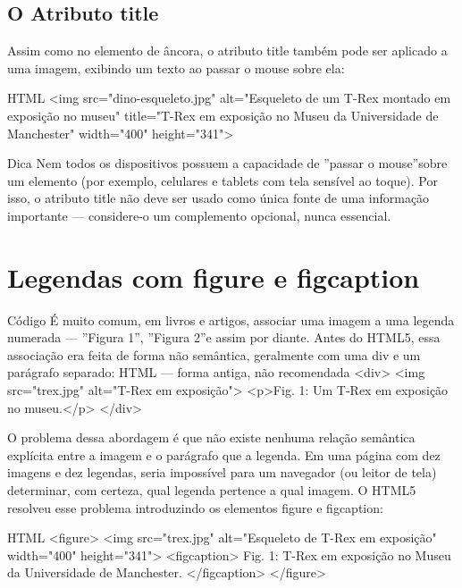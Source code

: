 \subsection{O Atributo title}

Assim como no elemento de âncora, o atributo title também pode ser aplicado a uma imagem, exibindo um texto ao passar o mouse sobre ela:

\begin{codebox}{HTML}
 <img src="dino-esqueleto.jpg"
      alt="Esqueleto de um T-Rex montado em exposição no museu"
      title="T-Rex em exposição no Museu da Universidade de Manchester"
      width="400"
      height="341">
\end{codebox}

\begin{infobox}{Dica}
Nem todos os dispositivos possuem a capacidade de ”passar o mouse”sobre um elemento (por exemplo, celulares e tablets com tela sensível ao toque). Por isso, o atributo title não deve ser usado como única fonte de uma informação importante — considere-o um complemento opcional, nunca essencial.
\end{infobox}

\section{Legendas com figure e figcaption}

\begin{codebox}{Código}
É muito comum, em livros e artigos, associar uma imagem a uma legenda numerada
— ”Figura 1”, ”Figura 2”e assim por diante. Antes do HTML5, essa associação era
feita de forma não semântica, geralmente com uma div e um parágrafo separado:
HTML — forma antiga, não recomendada
<div>
<img src="trex.jpg" alt="T-Rex em exposição">
<p>Fig. 1: Um T-Rex em exposição no museu.</p>
</div>
\end{codebox}

O problema dessa abordagem é que não existe nenhuma relação semântica explícita entre a imagem e o parágrafo que a legenda. Em uma página com dez imagens e dez legendas, seria impossível para um navegador (ou leitor de tela) determinar, com certeza, qual legenda pertence a qual imagem. O HTML5 resolveu esse problema introduzindo os elementos figure e figcaption:

\begin{codebox}{HTML}
 <figure>
   <img src="trex.jpg" alt="Esqueleto de T-Rex em exposição"
        width="400" height="341">
   <figcaption>
     Fig. 1: T-Rex em exposição no Museu da Universidade de Manchester.
   </figcaption>
 </figure>
\end{codebox}

